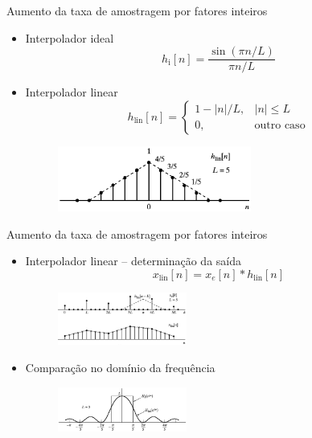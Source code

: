\begin{slide}{Aumento da taxa de amostragem por fatores inteiros }
	\begin{itemize}
		\item Interpolador ideal
			\begin{equation*}
				h_\text{i}[n] = \frac{\sin (\pi n/L)}{\pi n/L}
			\end{equation*}
		\item Interpolador linear
			\begin{equation*}
				h_\text{lin}[n] = \begin{cases} 1-|n|/L, & |n|\leq L\\ 0, & \text{outro caso} \end{cases}
			\end{equation*}
			\begin{figure}
				\centering
				\includegraphics[width=0.6\textwidth]{figs/4-25.eps}
		        \end{figure}
	\end{itemize}
\end{slide}
\begin{slide}{Aumento da taxa de amostragem por fatores inteiros }
	\begin{itemize}
		\item Interpolador linear -- determinação da saída
			\begin{equation*}
				x_\text{lin}[n]=x_e[n]*h_\text{lin}[n]
			\end{equation*}
			\begin{figure}
				\centering
				\includegraphics[width=0.4\textwidth]{figs/4-26a.eps}
		        \end{figure}
		\item Comparação no domínio da frequência 
			\begin{figure}
				\centering
				\includegraphics[width=0.4\textwidth]{figs/4-26b.eps}
		        \end{figure}
	\end{itemize}
\end{slide}
